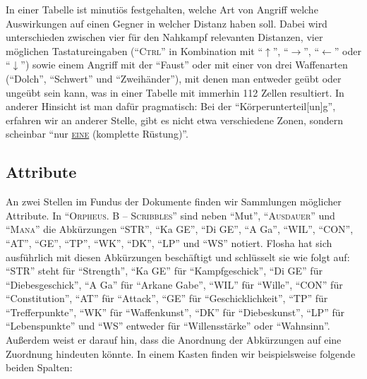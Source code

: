 \documentclass[a5paper,pagesize,numbers=noenddot]{scrbook}
\begin{document}
In einer Tabelle ist minutiös festgehalten, welche Art von Angriff welche Auswirkungen auf einen Gegner in welcher Distanz haben soll.\autocite[Vgl.][S.~4--5]{orpheus_kampfsteuerung}
Dabei wird unterschieden zwischen vier für den Nahkampf relevanten Distanzen, vier möglichen Tastatureingaben (\enquote{\textsc{Ctrl}} in Kombination mit \enquote{$\uparrow$}, \enquote{$\rightarrow$}, \enquote{$\leftarrow$} oder \enquote{$\downarrow$}) sowie einem Angriff mit der \enquote{Faust} oder mit einer von drei Waffenarten (\enquote{Dolch}, \enquote{Schwert} und \enquote{Zweihänder}), mit denen man entweder geübt oder ungeübt sein kann, was in einer Tabelle mit immerhin 112 Zellen resultiert.\autocite[S.~4]{orpheus_kampfsteuerung}
In anderer Hinsicht ist man dafür pragmatisch:
Bei der \enquote{Körperunterteil[un]g}, erfahren wir an anderer Stelle, gibt es nicht etwa verschiedene Zonen, sondern scheinbar \enquote{nur \uline{\textsc{eine}} (komplette Rüstung)}.\autocite[S.~8]{orpheus_b_scribbles}


\subsection{Attribute}\label{sec:orpheus_mechanik_attribute}
An zwei Stellen im Fundus der Dokumente finden wir Sammlungen möglicher Attribute.
In \enquote{\textsc{Orpheus. B -- Scribbles}} sind neben \enquote{Mut}, \enquote{\textsc{Ausdauer}} und \enquote{\textsc{Mana}} die Abkürzungen \enquote{STR}, \enquote{Ka GE}, \enquote{Di GE}, \enquote{A Ga}, \enquote{WIL}, \enquote{CON}, \enquote{AT}, \enquote{GE}, \enquote{TP}, \enquote{WK}, \enquote{DK}, \enquote{LP} und \enquote{WS} notiert.\autocite[S.~8]{orpheus_b_scribbles}
Flosha hat sich ausführlich mit diesen Abkürzungen beschäftigt und schlüsselt sie wie folgt auf:
\enquote{STR} steht für \enquote{Strength}, \enquote{Ka GE} für \enquote{Kampfgeschick}, \enquote{Di GE} für \enquote{Diebesgeschick}, \enquote{A Ga} für \enquote{Arkane Gabe}, \enquote{WIL} für \enquote{Wille}, \enquote{CON} für \enquote{Constitution}, \enquote{AT} für \enquote{Attack}, \enquote{GE} für \enquote{Geschicklichkeit}, \enquote{TP} für \enquote{Trefferpunkte}, \enquote{WK} für \enquote{Waffenkunst}, \enquote{DK} für \enquote{Diebeskunst}, \enquote{LP} für \enquote{Lebenspunkte} und \enquote{WS} entweder für \enquote{Willensstärke} oder \enquote{Wahnsinn}.
Außerdem weist er darauf hin, dass die Anordnung der Abkürzungen auf eine Zuordnung hindeuten könnte.\autocite[Vgl.][]{flosha_attributes_2022}
In einem Kasten\autocite[S.~8]{orpheus_b_scribbles} finden wir beispielsweise folgende beiden Spalten:
\end{document}
